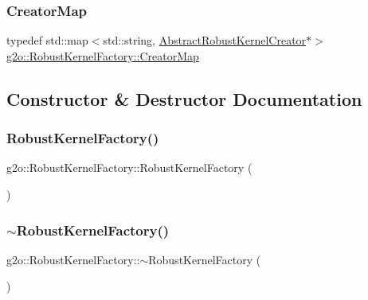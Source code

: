 \subsubsection{\texorpdfstring{Creator\+Map}{CreatorMap}}
{\footnotesize\ttfamily typedef std\+::map$<$std\+::string, \mbox{\hyperlink{classg2o_1_1_abstract_robust_kernel_creator}{Abstract\+Robust\+Kernel\+Creator}}$\ast$$>$ \mbox{\hyperlink{classg2o_1_1_robust_kernel_factory_aa143765542cbf4738e2137d61517b218}{g2o\+::\+Robust\+Kernel\+Factory\+::\+Creator\+Map}}\hspace{0.3cm}{\ttfamily [protected]}}



\subsection{Constructor \& Destructor Documentation}
\mbox{\label{classg2o_1_1_robust_kernel_factory_af1df5179d6823881c9c3531640029eae}} 
\subsubsection{\texorpdfstring{Robust\+Kernel\+Factory()}{RobustKernelFactory()}}
{\footnotesize\ttfamily g2o\+::\+Robust\+Kernel\+Factory\+::\+Robust\+Kernel\+Factory (\begin{DoxyParamCaption}{ }\end{DoxyParamCaption})\hspace{0.3cm}{\ttfamily [protected]}}

\mbox{\label{classg2o_1_1_robust_kernel_factory_a4b644b5cbf7f9bec42b8c168e8416011}} 
\subsubsection{\texorpdfstring{$\sim$\+Robust\+Kernel\+Factory()}{~RobustKernelFactory()}}
{\footnotesize\ttfamily g2o\+::\+Robust\+Kernel\+Factory\+::$\sim$\+Robust\+Kernel\+Factory (\begin{DoxyParamCaption}{ }\end{DoxyParamCaption})\hspace{0.3cm}{\ttfamily [protected]}}



